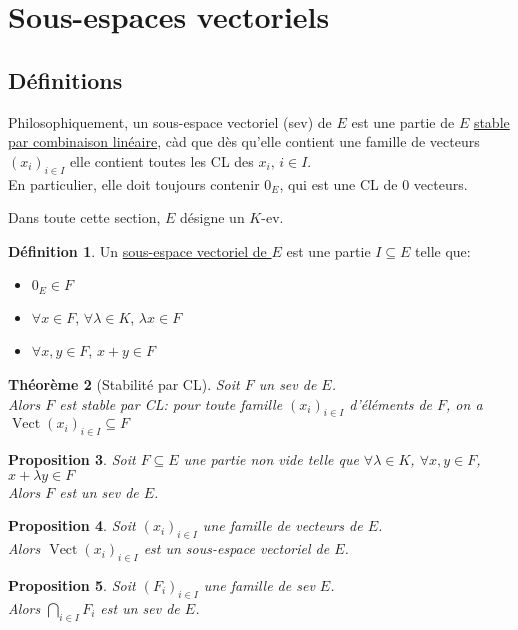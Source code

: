 \documentclass[10pt,a4paper]{article}
\theoremstyle{plain}
\newtheorem{proposition}{Proposition}[section]
\newtheorem{theorem}[proposition]{Théorème}
\theoremstyle{definition}
\newtheorem{definition}[proposition]{Définition}
\DeclareMathOperator{\vect}{Vect}
\begin{document}
\section{Sous-espaces vectoriels}
\subsection{Définitions}
Philosophiquement, un sous-espace vectoriel (sev) de $E$ est une partie de $E$ \uline{stable par combinaison linéaire}, càd que dès qu'elle contient une famille de vecteurs $(x_i)_{i \in I}$ elle contient toutes les CL des $x_i,\, i \in I$. \\
En particulier, elle doit toujours contenir $0_E$, qui est une CL de $0$ vecteurs.\medskip

Dans toute cette section, $E$ désigne un $K$-ev.
\begin{definition}
Un \uline{sous-espace vectoriel de $E$} est une partie $I \subseteq E$ telle que:
\begin{itemize}
\item $0_E \in F$
\item $\forall x \in F$, $\forall \lambda \in K$, $\lambda x \in F$
\item $\forall x, y \in F$, $x + y \in F$
\end{itemize}
\end{definition}
\begin{theorem}[Stabilité par CL]
Soit $F$ un sev de $E$. \\
Alors $F$ est stable par CL: pour toute famille $(x_i)_{i \in I}$ d'éléments de $F$, on a $\vect(x_i)_{i \in I} \subseteq F$
\end{theorem} 
\begin{proposition}
Soit $F \subseteq E$ une partie non vide telle que $\forall \lambda \in K$, $\forall x, y \in F$, $x + \lambda y \in F$ \\
Alors $F$ est un sev de $E$.
\end{proposition}
\begin{proposition}
Soit $(x_i)_{i \in I}$ une famille de vecteurs de $E$. \\
Alors $\vect(x_i)_{i \in I}$ est un sous-espace vectoriel de $E$.
\end{proposition}
\begin{proposition}
Soit $(F_i)_{i \in I}$ une famille de sev $E$. \\
Alors $\bigcap\limits_{i \in I} F_i$ est un sev de $E$.
\end{proposition}
\end{document}

